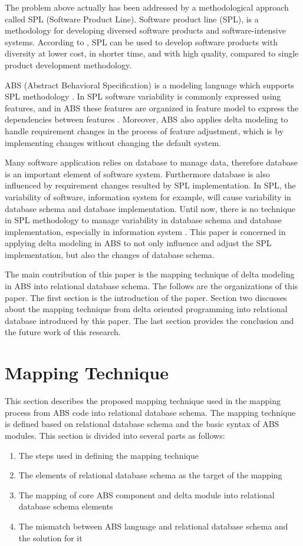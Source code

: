\documentclass[conference]{IEEEtran}
\begin{document}
The problem above actually has been addressed by a methodological approach called SPL (Software Product Line). Software product line (SPL), is a methodology for developing diversed software products and software-intensive systems. According to \cite{book1}, SPL can be used to develop software products with diversity at lower cost, in shorter time, and with high quality, compared to single product development methodology.

ABS (Abstract Behavioral Specification) is a modeling language which supports SPL methodology \cite{lncschap}. In SPL software variability is commonly expressed using features, and in ABS these features are organized in feature model to express the dependencies between features \cite{url}. Moreover, ABS also applies delta modeling to handle requirement changes in the process of feature adjustment, which is by implementing changes without changing the default system.

Many software application relies on database to manage data, therefore database is an important element of software system. Furthermore database is also influenced by requirement changes resulted by SPL implementation. In SPL, the variability of software, information system for example, will cause variability in database schema and database implementation. Until now, there is no technique in SPL methodology to manage variability in database schema and database implementation, especially in information system \cite{article}. This paper is concerned in applying delta modeling in ABS to not only influence and adjust the  SPL implementation, but also the changes of database schema.

The main contribution of this paper is the mapping technique of delta modeling in ABS into relational database schema. The follows are the organizations of this paper. 
The first section is the introduction of the paper. 
Section two discusses about the mapping technique from delta oriented programming into relational database introduced by this paper. 
The last section provides the conclusion and the future work of this research.

\section{Mapping Technique}
This section describes the proposed mapping technique used in the mapping process from ABS code into relational database schema. The mapping technique is defined based on relational database schema and the basic syntax of ABS modules. This section is divided into several parts as follows:
\begin{enumerate}
	\item The steps used in defining the mapping technique
	\item The elements of relational database schema as the target of the mapping
	\item The mapping of core ABS component and delta module into relational database schema elements
	\item The mismatch between ABS language and relational database schema and the solution for it
\end{enumerate}
\end{document}
